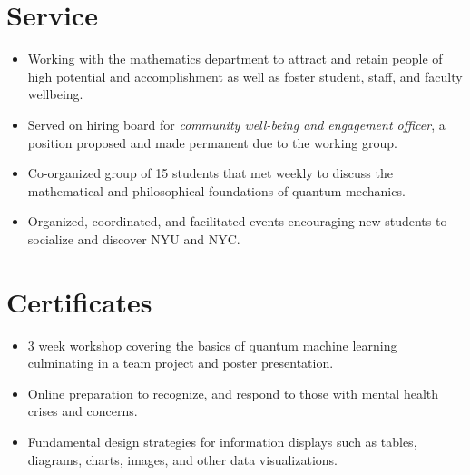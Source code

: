 \documentclass{cultvoucher}
\begin{document}
\section{Service}

\begin{itemize}
	\item Working with the mathematics department to attract and retain people of high potential and accomplishment as well as foster student, staff, and faculty wellbeing.
	\item Served on hiring board for \emph{community well-being and engagement officer}, a position proposed and made permanent due to the working group.
\end{itemize}

\begin{itemize}
	\item Co-organized group of 15 students that met weekly to discuss the mathematical and philosophical foundations of quantum mechanics.
\end{itemize}

\begin{itemize}
	\item Organized, coordinated, and facilitated events encouraging new students to socialize and discover NYU and NYC.
\end{itemize}

\section{Certificates}
\begin{itemize}
	\item 3 week workshop covering the basics of quantum machine learning culminating in a team project and poster presentation.
\end{itemize}
\begin{itemize}
	\item Online preparation to recognize, and respond to those with mental health crises and concerns.
\end{itemize}
\begin{itemize}
	\item Fundamental design strategies for information displays such as tables, diagrams, charts, images, and other data visualizations.
\end{itemize}
\end{document}
